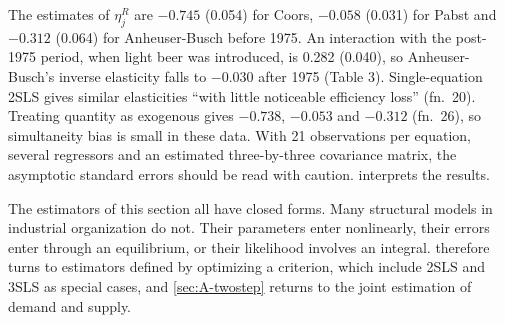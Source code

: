 The estimates of $\eta^R_j$ are $-0.745$ (0.054) for Coors, $-0.058$ (0.031) for Pabst and $-0.312$ (0.064) for
Anheuser-Busch before 1975. An interaction with the post-1975 period, when light beer was introduced, is 0.282
(0.040), so Anheuser-Busch's inverse elasticity falls to $-0.030$ after 1975 (Table 3). Single-equation 2SLS gives
similar elasticities ``with little noticeable efficiency loss'' (fn.~20). Treating quantity as exogenous gives
$-0.738$, $-0.053$ and $-0.312$ (fn.~26), so simultaneity bias is small in these data. With 21 observations per
equation, several regressors and an estimated three-by-three covariance matrix, the asymptotic standard errors
should be read with caution.  interprets the results.

The estimators of this section all have closed forms. Many structural models in industrial organization do not.
Their parameters enter nonlinearly, their errors enter through an equilibrium, or their likelihood involves an
integral.  therefore turns to estimators defined by optimizing a criterion, which include
2SLS and 3SLS as special cases, and \cref{sec:A-twostep} returns to the joint estimation of demand and supply.
